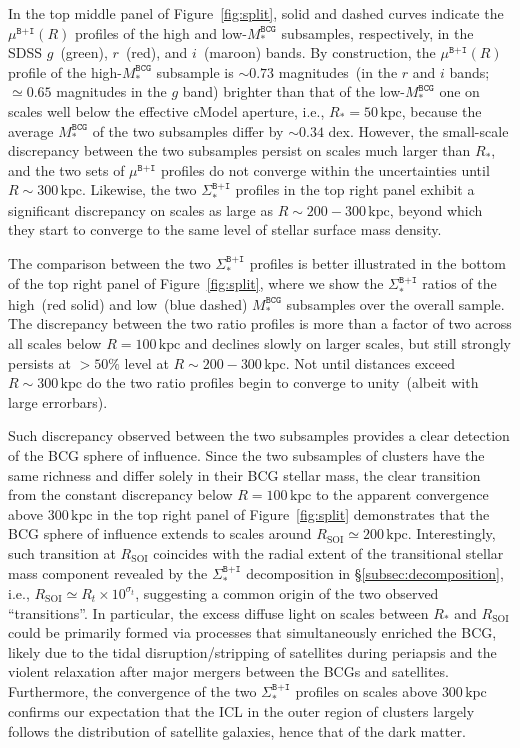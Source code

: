 \documentclass[fleqn,usenatbib]{mnras}
\newcommand{\rsoi}{R_{\mathrm{SOI}}}
\newcommand{\sigbi}{\Sigma_*^{\texttt{B+I}}}
\newcommand{\mubi}{\mu^{\texttt{B+I}}}
\newcommand{\msbcg}{M_*^{\texttt{BCG}}}
\newcommand{\kpc}{\mathrm{kpc}}
\begin{document}
In the top middle panel of Figure~\ref{fig:split}, solid and dashed curves
indicate the $\mubi(R)$ profiles of the high and low-$\msbcg$ subsamples,
respectively, in the SDSS $g$~(green), $r$~(red), and $i$~(maroon) bands.
By construction, the $\mubi(R)$ profile of the high-$\msbcg$ subsample is
${\sim}0.73$ magnitudes~(in the $r$ and $i$ bands; ${\simeq}0.65$
magnitudes in the $g$ band) brighter than that of the low-$\msbcg$ one on
scales well below the effective cModel aperture, i.e., $R_*{=}50\,\kpc$,
because the average $\msbcg$ of the two subsamples differ by
${\sim}0.34$ dex. However, the small-scale discrepancy between the two
subsamples persist on scales much larger than $R_*$, and the two sets of
$\mubi$ profiles do not converge within the uncertainties until
$R{\sim}300\,\kpc$. Likewise, the two $\sigbi$ profiles in the top right
panel exhibit a significant discrepancy on scales as large as
$R{\sim}200{-}300\,\kpc$, beyond which they start to converge to the same
level of stellar surface mass density.


The comparison between the two $\sigbi$ profiles is better illustrated in
the bottom of the top right panel of Figure~\ref{fig:split}, where we show
the $\sigbi$ ratios of the high~(red solid) and low~(blue dashed) $\msbcg$
subsamples over the overall sample.  The discrepancy between the two ratio
profiles is more than a factor of two across all scales below
$R{=}100\,\kpc$ and declines slowly on larger scales, but still
strongly persists at ${>}50\%$ level at $R{\sim}200{-}300\,\kpc$. Not until
distances exceed $R{\sim}300\,\kpc$ do the two ratio profiles begin to
converge to unity~(albeit with large errorbars).


Such discrepancy observed between the two subsamples provides a clear
detection of the BCG sphere of influence. Since the two subsamples of
clusters have the same richness and differ solely in their BCG stellar
mass, the clear transition from the constant discrepancy below
$R{=}100\,\kpc$ to the apparent convergence above $300\,\kpc$ in the top
right panel of Figure~\ref{fig:split} demonstrates that the BCG sphere of
influence extends to scales around $\rsoi{\simeq}200\,\kpc$.
Interestingly, such transition at $\rsoi$ coincides with the radial extent
of the transitional stellar mass component revealed by the $\sigbi$
decomposition in \S\ref{subsec:decomposition}, i.e.,
$\rsoi{\simeq}R_t{\times}10^{\sigma_t}$, suggesting a common origin of the
two observed ``transitions''. In particular, the excess diffuse light on
scales between $R_*$ and $\rsoi$ could be primarily formed via processes
that simultaneously enriched the BCG, likely due to the tidal
disruption/stripping of satellites during periapsis and the violent
relaxation after major mergers between the BCGs and satellites.
Furthermore, the convergence of the two $\sigbi$ profiles on scales above
$300\,\kpc$ confirms our expectation that the ICL in the outer region of
clusters largely follows the distribution of satellite galaxies, hence that
of the dark matter.
\end{document}
